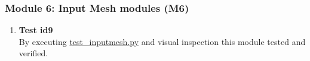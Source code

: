 \documentclass[12pt, titlepage]{article}
\begin{document}
\subsubsection{Module 6: Input Mesh modules (M6)}

\begin{enumerate}
	\item{\textbf{Test id9}\\}
	By executing \href{https://github.com/shmouses/SPDFM/tree/master/src/test_inputmesh.py}{test\_inputmesh.py} and visual inspection this module tested and verified. 
\end{enumerate}

\newpage




\end{document}
